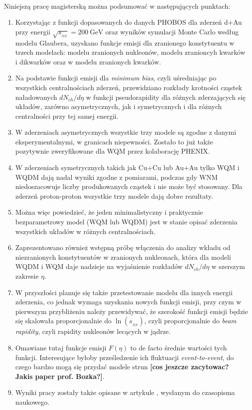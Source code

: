 \documentclass[a4paper,12pt]{article}
\begin{document}
\paragraph{}
Niniejszą pracę magisterską można podsumować w następujących punktach:
\begin{enumerate}[label=(\roman*)]
	\item Korzystając z funkcji dopasowanych do danych PHOBOS dla zderzeń d+Au przy energii $\sqrt{s_{_{NN}}} = 200~\text{GeV}$ oraz wyników symulacji Monte Carlo według modelu Glaubera, uzyskano funkcje emisji dla zranionego konstytuentu w trzech modelach: modelu zranionych nukleonów, modelu zranioncyh kwarków i dikwarków oraz w modelu zranionych kwarków.
	\item Na podstawie funkcji emisji dla \textit{minimum bias}, czyli uśredniając po wszystkich centralnościach zderzeń, przewidziano rozkłady krotności cząstek naładowanych $dN_{ch}/d\eta$ w funkcji pseudorapidity dla różnych zderzających się układów, zarówno asymetrycznych, jak i symetrycznych i dla różnych centralności przy tej samej energii.
	\item W zderzeniach asymetrycznych wszystkie trzy modele są zgodne z danymi eksperymentalnymi, w granicach niepewności. Zostało to już także pozytywnie zweryfikowane dla WQM przez kolaborację PHENIX. 
	\item W zderzeniach symetrycznych takich jak Cu+Cu lub Au+Au tylko WQM i WQDM dają nadal wyniki zgodne z pomiarami, podczas gdy WNM niedoszacowuje liczby produkowanych cząstek i nie może być stosowany. Dla zderzeń proton-proton wszystkie trzy modele dają dobre rezultaty.
	\item Można więc powiedzieć, że jeden minimalistyczny i praktycznie bezparametrowy model (WQM lub WQDM) jest w stanie opisać zderzenia wszystkich układów w różnych centralnościach.
	\item Zaprezentowano również wstępną próbę włączenia do analizy wkładu od niezranionych konstytuentów w zranionych nukleonach, która dla modeli WQDM i WQM daje nadzieje na wyjaśnienie rozkładów $dN_{ch}/d\eta$ w szerszym zakresie $\eta$.
	\item W przyszłości planuje się także przetestowanie modelu dla innych energii zderzenia, co jednak wymaga uzyskania nowych funkcji emisji, przy czym w pierwszym przybliżeniu należy przewidywać, że szerokość funkcji emisji  będzie się skalowała proporcjonalnie do $\ln(s_{_{NN}})$, czyli proporcjonalnie do \textit{beam rapidity}, czyli rapidity nukleonów lecących w jądrze.
	\item Omawiane tutaj funkcje emisji $F(\eta)$ to de facto średnie wartości tych funkcji. Interesujące byłoby prześledzenie ich fluktuacji \textit{event-to-event}, do czego bardzo mogą się przydać modele strun \cite{Rohrmoser:2018shp,Broniowski:2019zkd,Rohrmoser:2019cew} \textbf{\color{blue} [cos jeszcze zacytowac? Jakis paper prof. Bozka?]}.
	\item Wyniki pracy zostały także opisane w artykule \cite{Barej:2019xef}, wysłanym do czasopisma naukowego.
\end{enumerate}
\end{document}
